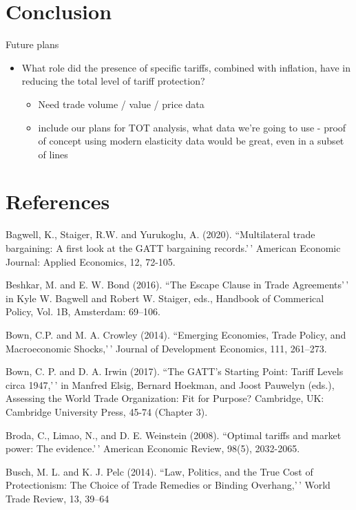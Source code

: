 \documentclass[
  12pt,
]{article}
\begin{document}
\hypertarget{conclusion}{%
\section{Conclusion}\label{conclusion}}

Future plans

\begin{itemize}
\item
  What role did the presence of specific tariffs, combined with inflation, have in reducing the total level of tariff protection?

  \begin{itemize}
  \item
    Need trade volume / value / price data
  \item
    include our plans for TOT analysis, what data we're going to use - proof of concept using modern elasticity data would be great, even in a subset of lines
  \end{itemize}
\end{itemize}

\hypertarget{references}{%
\section{References}\label{references}}

Bagwell, K., Staiger, R.W. and Yurukoglu, A. (2020). ``Multilateral trade bargaining: A first look at the GATT bargaining records.'\,' American Economic Journal: Applied Economics, 12, 72-105.

Beshkar, M. and E. W. Bond (2016). ``The Escape Clause in Trade Agreements'\,' in Kyle W. Bagwell and Robert W. Staiger, eds., Handbook of Commerical Policy, Vol. 1B, Amsterdam: 69--106.

Bown, C.P. and M. A. Crowley (2014). ``Emerging Economies, Trade Policy, and Macroeconomic Shocks,'\,' Journal of Development Economics, 111, 261--273.

Bown, C. P. and D. A. Irwin (2017). ``The GATT's Starting Point: Tariff Levels circa 1947,'\,' in Manfred Elsig, Bernard Hoekman, and Joost Pauwelyn (eds.), Assessing the World Trade Organization: Fit for Purpose? Cambridge, UK: Cambridge University Press, 45-74 (Chapter 3).

Broda, C., Limao, N., and D. E. Weinstein (2008). ``Optimal tariffs and market power: The
evidence.'\,' American Economic Review, 98(5), 2032-2065.

Busch, M. L. and K. J. Pelc (2014). ``Law, Politics, and the True Cost of Protectionism: The Choice of Trade Remedies or Binding Overhang,'\,' World Trade Review, 13, 39--64
\end{document}
